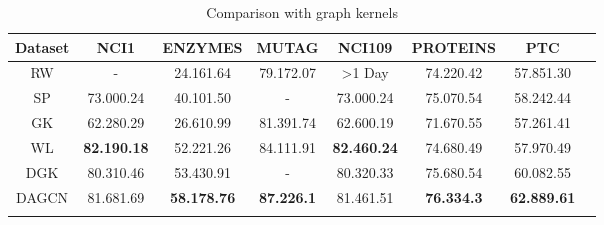 \documentclass[conference]{IEEEtran}
\begin{document}
\begin{table*}[t]
\centering
\caption{Comparison with graph kernels}
\begin{tabular}{cccccccc}
\hline
Dataset              & NCI1   & ENZYMES                 & MUTAG                   & NCI109                  & PROTEINS                & PTC     \\
\hline
RW           & -                    & 24.161.64       & 79.172.07       & \textgreater 1 Day   & 74.220.42       & 57.851.30 \\
SP                   & 73.000.24       & 40.101.50       & -                    & 73.000.24       & 75.070.54       & 58.242.44 \\
GK                   & 62.280.29          & 26.610.99       & 81.391.74       & 62.600.19       & 71.670.55       & 57.261.41 \\
WL                   & \textbf{82.190.18}             & 52.221.26       & 84.111.91       & \textbf{82.460.24}       & 74.680.49       & 57.970.49 \\
DGK                  & 80.310.46          & 53.430.91       & -                    & 80.320.33       & 75.680.54       & 60.082.55 \\
DAGCN               & 81.681.69          & \textbf{58.178.76}       & \textbf{87.226.1}        & 81.461.51       & \textbf{76.334.3}        & \textbf{62.889.61} \\ 
\hline
\multicolumn{1}{l}{} & \multicolumn{1}{l}{} & \multicolumn{1}{l}{} & \multicolumn{1}{l}{} & \multicolumn{1}{l}{} & \multicolumn{1}{l}{} & \multicolumn{1}{l}{} &               
\end{tabular}
\label{tb:result2}
\end{table*}
\end{document}
